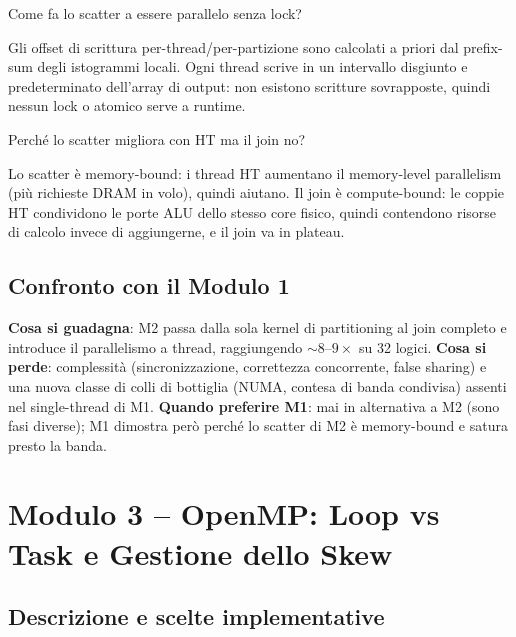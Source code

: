 \documentclass[11pt,a4paper]{article}
\theoremstyle{remark}
\newenvironment{esercizio}[1][]{%
  \begin{tcolorbox}[breakable,title={\textbf{Esercizio / Domanda d'esame}\ifx&#1&\else: #1\fi},
    colback=yellow!5!white, colframe=orange!75!black, fonttitle=\small\bfseries]%
}{%
  \end{tcolorbox}%
}
\newenvironment{risposta}{%
  \begin{tcolorbox}[breakable,title={\textbf{Risposta}},
    colback=green!5!white, colframe=green!50!black, fonttitle=\small\bfseries]%
}{%
  \end{tcolorbox}%
}
\begin{document}
\begin{esercizio}[M2 -- Scatter lock-free]
Come fa lo scatter a essere parallelo senza lock?
\end{esercizio}
\begin{risposta}
Gli offset di scrittura per-thread/per-partizione sono calcolati a priori dal prefix-sum degli istogrammi locali. Ogni thread scrive in un intervallo disgiunto e predeterminato dell'array di output: non esistono scritture sovrapposte, quindi nessun lock o atomico serve a runtime.
\end{risposta}

\begin{esercizio}[M2 -- Hyper-Threading]
Perch\'e lo scatter migliora con HT ma il join no?
\end{esercizio}
\begin{risposta}
Lo scatter \`e memory-bound: i thread HT aumentano il memory-level parallelism (pi\`u richieste DRAM in volo), quindi aiutano. Il join \`e compute-bound: le coppie HT condividono le porte ALU dello stesso core fisico, quindi contendono risorse di calcolo invece di aggiungerne, e il join va in plateau.
\end{risposta}

\subsection{Confronto con il Modulo 1}

\textbf{Cosa si guadagna}: M2 passa dalla sola kernel di partitioning al join completo e introduce il parallelismo a thread, raggiungendo $\sim$8--$9\times$ su 32 logici. \textbf{Cosa si perde}: complessit\`a (sincronizzazione, correttezza concorrente, false sharing) e una nuova classe di colli di bottiglia (NUMA, contesa di banda condivisa) assenti nel single-thread di M1. \textbf{Quando preferire M1}: mai in alternativa a M2 (sono fasi diverse); M1 dimostra per\`o perch\'e lo scatter di M2 \`e memory-bound e satura presto la banda.


\section{Modulo 3 -- OpenMP: Loop vs Task e Gestione dello Skew}
\label{sec:m3}

\subsection{Descrizione e scelte implementative}
\end{document}
